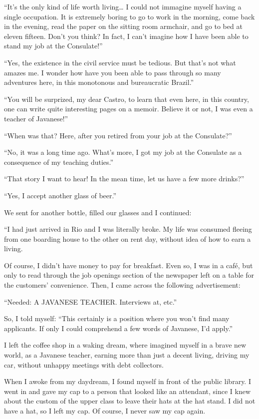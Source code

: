 \documentclass[a4paper,12pt]{book}
\begin{document}
``It's the only kind of life worth living\ldots
I could not immagine
myself having a single occupation.
It is extremely boring
to go to work in the morning,
come back in the evening, read the paper
on the sitting room armchair,
and go to bed at eleven fifteen.
Don't you think?
In fact, I can't imagine how I have been
able to stand my job at the Consulate!''


``Yes, the existence in the civil service
must be tedious. But that's not
what amazes me. I wonder how have you been
able to pass through so many adventures here,
in this monotonous and bureaucratic Brazil.''

``You will be surprized, my dear Castro,
to learn that even here, in this country,
one can write quite interesting pages on a
memoir. Believe it or not,
I was even a teacher of Javanese!''

``When was that? Here, after you retired
from your job at the Consulate?''


``No, it was a long time ago.
What's more, I got my job at the
Consulate as a consequence of my
teaching duties.''

``That story I want to hear! In the mean time,
let us have a few more drinks?''

``Yes, I accept another glass of beer.''

We sent for another bottle, filled our glasses
and I continued:

``I had just arrived in Rio and I was literally broke.
My life was consumed fleeing
from one boarding house to
the other on rent day, without
idea of how to earn a living.

Of course, I didn't have money
to pay for breakfast.
Even so, I was in a café, but only to
read through the job openings section
of the newspaper left on a table
for the customers' convenience. Then, I came across
the following advertisement:


``Needed: A JAVANESE TEACHER.  Interviews at, etc.''

So, I told myself: ``This certainly is a position
where you won't find many applicants. If only I
could comprehend a few words of Javanese,
I'd apply.''

I left the coffee shop in a waking dream,
where imagined myself in a brave new world,
as a Javanese teacher,
earning more than just a decent living,
driving my car,
without unhappy meetings with debt collectors.

When I awoke from my daydream,
I found myself in front of the public library.
I went in and gave my cap to a
person that looked like an attendant,
since I knew about the custom of the
upper class to leave their hats at
the hat stand. I did not have
a hat, so I left my cap. Of course,
I never saw my cap again.
\end{document}
